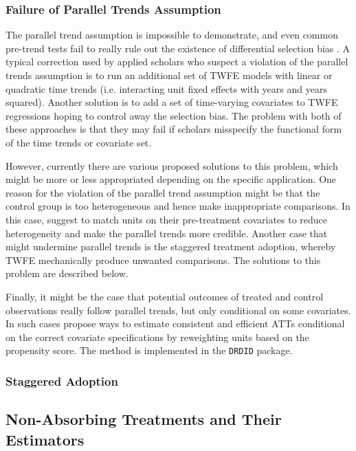 \documentclass[hidelinks]{article}\usepackage[]{graphicx}\usepackage[]{color}
\begin{document}
\subsubsection{Failure of Parallel Trends Assumption}

The parallel trend assumption is impossible to demonstrate, and even common pre-trend tests fail to really rule out the existence of differential selection bias \parencite{Roth2022}. A typical correction used by applied scholars who suspect a violation of the parallel trends assumption is to run an additional set of TWFE models with linear or quadratic time trends (i.e. interacting unit fixed effects with years and years squared). Another solution is to add a set of time-varying covariates to TWFE regressions hoping to control away the selection bias. The problem with both of these approaches is that they may fail if scholars misspecify the functional form of the time trends or covariate set.

However, currently there are various proposed solutions to this problem, which might be more or less appropriated depending on the specific application. 
One reason for the violation of the parallel trend assumption might be that the control group is too heterogeneous and hence make inappropriate comparisons. In this case, \textcite{Abadie2005,Imai2021} suggest to match units on their pre-treatment covariates to reduce heterogeneity and make the parallel trends more credible.
Another case that might undermine parallel trends is the staggered treatment adoption, whereby TWFE mechanically produce unwanted comparisons. The solutions to this problem are described below.

Finally, it might be the case that potential outcomes of treated and control observations really follow parallel trends, but only conditional on some covariates. In such cases \textcite{SantAnna2020} propose ways to estimate consistent and efficient ATTs conditional on the correct covariate specifications by reweighting units based on the propensity score. The method is implemented in the \texttt{DRDID} package.

\subsubsection{Staggered Adoption}



\subsection{Non-Absorbing Treatments and Their Estimators}
\end{document}
